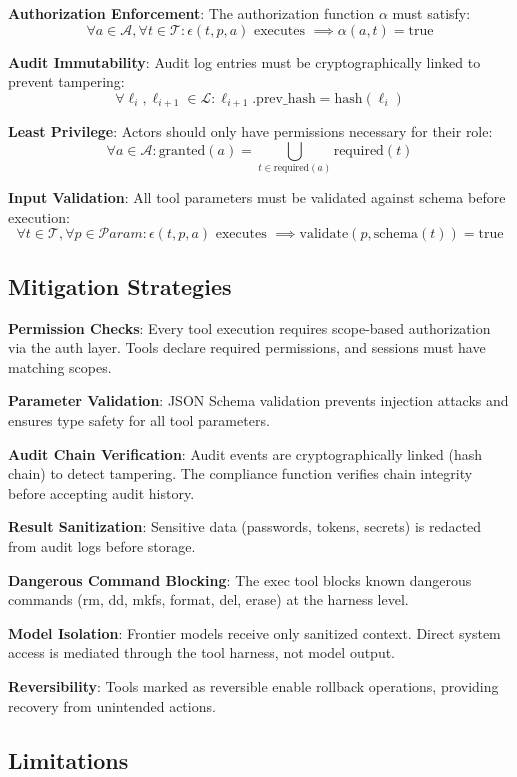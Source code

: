 \documentclass[11pt,a4paper]{article}
\begin{document}
\textbf{Authorization Enforcement}: The authorization function $\alpha$ must satisfy:
\[
\forall a \in \mathcal{A}, \forall t \in \mathcal{T}: \epsilon(t, p, a) \text{ executes } \implies \alpha(a, t) = \text{true}
\]

\textbf{Audit Immutability}: Audit log entries must be cryptographically linked to prevent tampering:
\[
\forall \ell_i, \ell_{i+1} \in \mathcal{L}: \ell_{i+1}.\text{prev\_hash} = \text{hash}(\ell_i)
\]

\textbf{Least Privilege}: Actors should only have permissions necessary for their role:
\[
\forall a \in \mathcal{A}: \text{granted}(a) = \bigcup_{t \in \text{required}(a)} \text{required}(t)
\]

\textbf{Input Validation}: All tool parameters must be validated against schema before execution:
\[
\forall t \in \mathcal{T}, \forall p \in \mathcal{P}aram: \epsilon(t, p, a) \text{ executes } \implies \text{validate}(p, \text{schema}(t)) = \text{true}
\]

\subsection{Mitigation Strategies}

\textbf{Permission Checks}: Every tool execution requires scope-based authorization via the auth layer. Tools declare required permissions, and sessions must have matching scopes.

\textbf{Parameter Validation}: JSON Schema validation prevents injection attacks and ensures type safety for all tool parameters.

\textbf{Audit Chain Verification}: Audit events are cryptographically linked (hash chain) to detect tampering. The compliance function verifies chain integrity before accepting audit history.

\textbf{Result Sanitization}: Sensitive data (passwords, tokens, secrets) is redacted from audit logs before storage.

\textbf{Dangerous Command Blocking}: The exec tool blocks known dangerous commands (rm, dd, mkfs, format, del, erase) at the harness level.

\textbf{Model Isolation}: Frontier models receive only sanitized context. Direct system access is mediated through the tool harness, not model output.

\textbf{Reversibility}: Tools marked as reversible enable rollback operations, providing recovery from unintended actions.

\subsection{Limitations}
\end{document}
